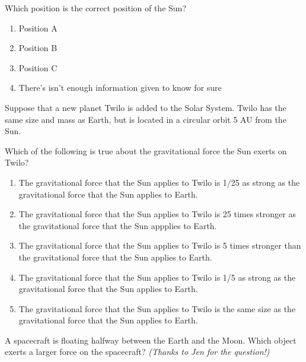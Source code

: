 \documentclass[12pt]{article}
\def\BS{\bigskip}
\begin{document}
\begin{enumerate}
\begin{minipage}{\textwidth}
{Which position is the correct position of the Sun? 

\begin{enumerate}[label=(\Alph*)]
\setlength\itemsep{0.0em}
\item{ Position A }
\item{ Position B }
\item{ Position C }
\item{ There's isn't enough information given to know for sure }
\end{enumerate}
} %
\end{minipage}


\vspace{0.5in}

\begin{minipage}{\textwidth}
\item{Suppose that a new planet Twilo is added to the Solar System. Twilo has the same size and mass as Earth, but is located in a circular
orbit 5 AU from the Sun.

\BS

Which of the following is true about the gravitational force the Sun exerts on Twilo?

\begin{enumerate}[label=(\Alph*)]
\setlength\itemsep{0.0em}
\item{ The gravitational force that the Sun applies to Twilo is 1/25 as strong as the gravitational force that the Sun applies to Earth. }
\item{ The gravitational force that the Sun applies to Twilo is 25 times stronger as the gravitational force that the Sun appplies to Earth.  }
\item{ The gravitational force that the Sun applies to Twilo is 5 times stronger than the gravitational force that the Sun applies to Earth. }
\item{ The gravitational force that the Sun applies to Twilo is 1/5 as strong as the gravitational force that the Sun applies to Earth. }
\item{ The gravitational force that the Sun applies to Twilo is the same size as the gravitational force that the Sun applies to Earth.  }
\end{enumerate}
} %
\end{minipage}


\vspace{0.5in}

\begin{minipage}{\textwidth}
\item{A spacecraft is floating halfway between the Earth and the Moon. Which object exerts a larger force on the spacecraft? {\it (Thanks to Jen for the question!)}

}
\end{minipage}
\end{enumerate}
\end{document}
